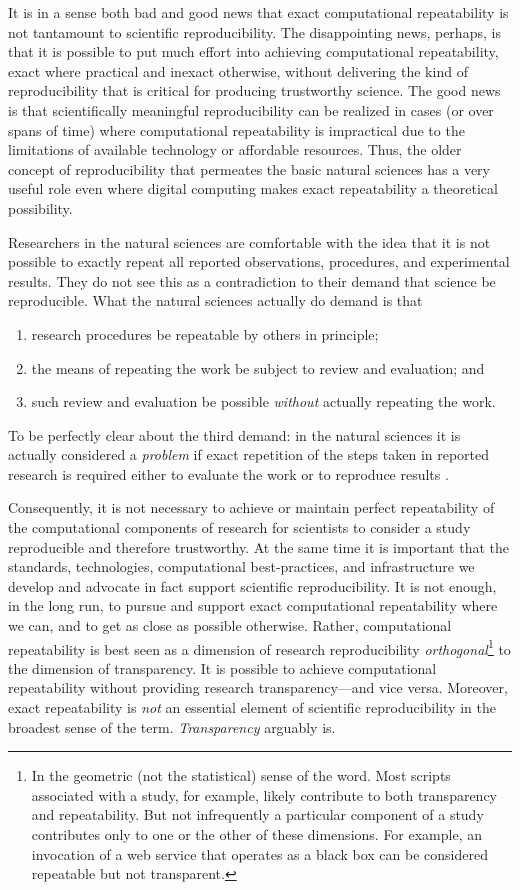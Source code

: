 It is in a sense both bad and good news that exact computational repeatability is not tantamount to scientific reproducibility.
The disappointing news, perhaps, is that it is possible to put much effort into achieving computational repeatability,
	exact where practical and inexact otherwise,
	without delivering the kind of reproducibility that is critical for producing trustworthy science.
The good news is that scientifically meaningful reproducibility can be realized in cases (or over spans of time)
	where computational repeatability is impractical due to the limitations of available technology or affordable resources.
Thus, the older concept of reproducibility that permeates the basic natural sciences has a very
	useful role even where digital computing makes exact repeatability a theoretical possibility.

 Researchers in the natural sciences are comfortable with the idea that it is not possible to exactly
	repeat all reported observations, procedures, and experimental results.
They do not see this as a contradiction to their demand that science be reproducible.
What the natural sciences actually do demand is that
\begin{enumerate}
\item research procedures be repeatable by others in principle;
\item the means of repeating the work be subject to review and
  evaluation; and
\item such review and evaluation be possible \emph{without}
  actually repeating the work.
\end{enumerate}
To be perfectly clear about the third demand: in the natural sciences
it is actually considered a \emph{problem} if exact repetition of the
steps taken in reported research is required either to evaluate the
work or to reproduce results \cite{milkowski2018replicability}.

Consequently, it is not necessary to achieve or
	maintain perfect repeatability of the computational components of research for scientists to
	consider a study reproducible and therefore trustworthy.
At the same time it is important that the standards, technologies,
	computational best-practices, and infrastructure we develop and advocate in fact support scientific reproducibility.
It is not enough, in the long run, to pursue and support exact computational repeatability where we can,
	and to get as close as possible otherwise.
Rather, computational repeatability is best seen as a dimension of research reproducibility
	\emph{orthogonal}\footnote{In the geometric (not the statistical) sense of the word.
	Most scripts associated with a study, for example, likely contribute to both transparency and repeatability.
    But not infrequently a particular component of a study contributes only to one or the other
	of these dimensions. For example, an invocation of a web service that
    operates as a black box can be considered repeatable but not transparent.}
	to the dimension of transparency.
It is possible to achieve computational repeatability without providing research transparency---and vice versa.
Moreover, exact repeatability is \emph{not} an essential element of
scientific reproducibility in the broadest sense of the term. \emph{Transparency} arguably is.
